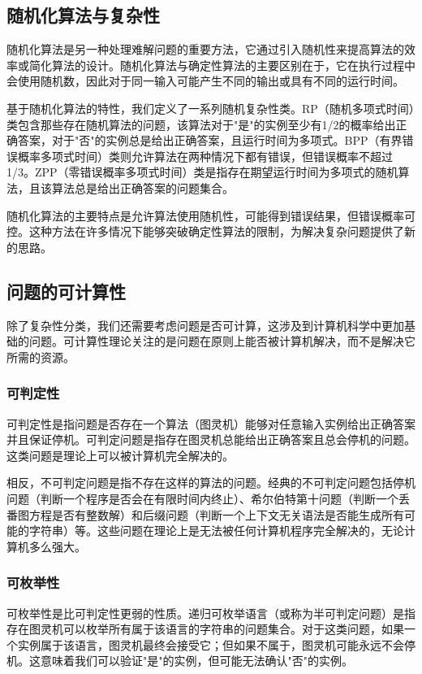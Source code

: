 \documentclass[a4paper,12pt]{ctexart}
\begin{document}
\subsection{随机化算法与复杂性}
随机化算法是另一种处理难解问题的重要方法，它通过引入随机性来提高算法的效率或简化算法的设计。随机化算法与确定性算法的主要区别在于，它在执行过程中会使用随机数，因此对于同一输入可能产生不同的输出或具有不同的运行时间。

基于随机化算法的特性，我们定义了一系列随机复杂性类。RP（随机多项式时间）类包含那些存在随机算法的问题，该算法对于"是"的实例至少有1/2的概率给出正确答案，对于"否"的实例总是给出正确答案，且运行时间为多项式。BPP（有界错误概率多项式时间）类则允许算法在两种情况下都有错误，但错误概率不超过1/3。ZPP（零错误概率多项式时间）类是指存在期望运行时间为多项式的随机算法，且该算法总是给出正确答案的问题集合。

随机化算法的主要特点是允许算法使用随机性，可能得到错误结果，但错误概率可控。这种方法在许多情况下能够突破确定性算法的限制，为解决复杂问题提供了新的思路。

\subsection{问题的可计算性}
除了复杂性分类，我们还需要考虑问题是否可计算，这涉及到计算机科学中更加基础的问题。可计算性理论关注的是问题在原则上能否被计算机解决，而不是解决它所需的资源。

\subsubsection{可判定性}
可判定性是指问题是否存在一个算法（图灵机）能够对任意输入实例给出正确答案并且保证停机。可判定问题是指存在图灵机总能给出正确答案且总会停机的问题。这类问题是理论上可以被计算机完全解决的。

相反，不可判定问题是指不存在这样的算法的问题。经典的不可判定问题包括停机问题（判断一个程序是否会在有限时间内终止）、希尔伯特第十问题（判断一个丢番图方程是否有整数解）和后缀问题（判断一个上下文无关语法是否能生成所有可能的字符串）等。这些问题在理论上是无法被任何计算机程序完全解决的，无论计算机多么强大。

\subsubsection{可枚举性}
可枚举性是比可判定性更弱的性质。递归可枚举语言（或称为半可判定问题）是指存在图灵机可以枚举所有属于该语言的字符串的问题集合。对于这类问题，如果一个实例属于该语言，图灵机最终会接受它；但如果不属于，图灵机可能永远不会停机。这意味着我们可以验证"是"的实例，但可能无法确认"否"的实例。
\end{document}
